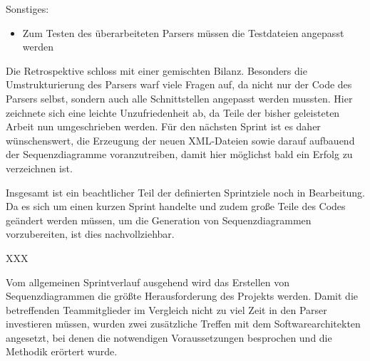 Sonstiges:
\begin{itemize}
\item Zum Testen des überarbeiteten Parsers müssen die Testdateien angepasst werden
\end{itemize}
\nsecend%

Die Retrospektive schloss mit einer gemischten Bilanz. Besonders die Umstrukturierung des Parsers warf viele Fragen auf, da nicht nur der Code des Parsers selbst, sondern auch alle Schnittstellen angepasst werden mussten. Hier zeichnete sich eine leichte Unzufriedenheit ab, da Teile der bisher geleisteten Arbeit nun umgeschrieben werden. Für den nächsten Sprint ist es daher wünschenswert, die Erzeugung der neuen XML-Dateien sowie darauf aufbauend der Sequenzdiagramme voranzutreiben, damit hier möglichst bald ein Erfolg zu verzeichnen ist.
\nsecend%

Insgesamt ist ein beachtlicher Teil der definierten Sprintziele noch in Bearbeitung. Da es sich um einen kurzen Sprint handelte und zudem große Teile des Codes geändert werden müssen, um die Generation von Sequenzdiagrammen vorzubereiten, ist dies nachvollziehbar. 
\nsecend%

XXX
\nsecend%

Vom allgemeinen Sprintverlauf ausgehend wird das Erstellen von Sequenzdiagrammen die größte Herausforderung des Projekts werden. Damit die betreffenden Teammitglieder im Vergleich nicht zu viel Zeit in den Parser investieren müssen, wurden zwei zusätzliche Treffen mit dem Softwarearchitekten angesetzt, bei denen die notwendigen Voraussetzungen besprochen und die Methodik erörtert wurde.
\nsecend%